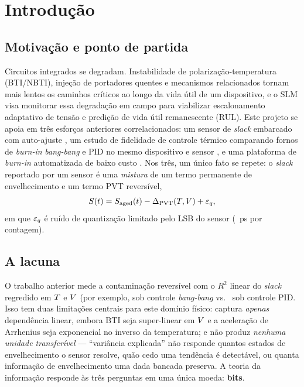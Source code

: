 \section{Introdução}
\label{sec:intro}


\subsection{Motivação e ponto de partida}
Circuitos integrados se degradam. Instabilidade de polarização-temperatura
(BTI/NBTI), injeção de portadores quentes e mecanismos relacionados tornam
mais lentos os caminhos críticos ao longo da vida útil de um dispositivo, e o
SLM visa monitorar essa degradação em campo para viabilizar escalonamento
adaptativo de tensão e predição de vida útil remanescente (RUL). Este projeto
se apoia em três esforços anteriores correlacionados: um sensor de \emph{slack}
embarcado com auto-ajuste \cite{nogueira_sensor}, um estudo de fidelidade de
controle térmico comparando fornos de \emph{burn-in} \emph{bang-bang} e PID no
mesmo dispositivo e sensor \cite{alencar_fidelity}, e uma plataforma de
\emph{burn-in} automatizada de baixo custo \cite{alencarfilho_tcc}. Nos três,
um único fato se repete: o \emph{slack} reportado por um sensor é uma
\emph{mistura} de um termo permanente de envelhecimento e um termo PVT
reversível,
\begin{equation}
  S(t) = S_{\mathrm{aged}}(t) - \Delta_{\mathrm{PVT}}(T,V) + \varepsilon_q ,
  \label{eq:model}
\end{equation}
em que $\varepsilon_q$ é ruído de quantização limitado pelo LSB do sensor
(\valLSBps~ps por contagem).

\subsection{A lacuna}
O trabalho anterior mede a contaminação reversível com o $R^2$ linear do
\emph{slack} regredido em $T$ e $V$ (por exemplo, \valRsqBangBang{}
sob controle \emph{bang-bang} vs.\ \valRsqPid{} sob controle PID. Isso tem
duas limitações centrais para este domínio físico: captura \emph{apenas}
dependência linear, embora BTI seja super-linear em $V$ e a aceleração de
Arrhenius seja exponencial no inverso da temperatura; e não produz
\emph{nenhuma unidade transferível} --- ``variância explicada'' não responde
quantos estados de envelhecimento o sensor resolve, quão cedo uma tendência é
detectável, ou quanta informação de envelhecimento uma dada bancada
preserva. A teoria da informação responde às três perguntas em uma única
moeda: \textbf{bits}.

